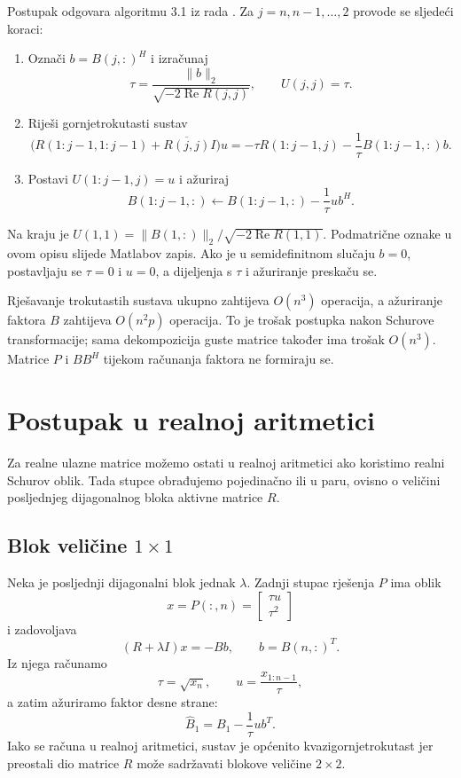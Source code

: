 \documentclass[12pt,a4paper]{article}
\begin{document}
Postupak odgovara algoritmu 3.1 iz rada \cite{sorensen}. Za $j = n,n-1,\ldots,2$ provode se sljedeći koraci:
\begin{enumerate}
\item Označi $b = B(j,:)^{H}$ i izračunaj
\[
\tau = \frac{\lVert b\rVert_2}{\sqrt{-2\operatorname{Re}R(j,j)}},
\qquad U(j,j) = \tau.
\]
\item Riješi gornjetrokutasti sustav
\[
\bigl(R(1{:}j{-}1,1{:}j{-}1) + \overline{R(j,j)}I\bigr)u
= -\tau R(1{:}j{-}1,j) - \frac{1}{\tau}B(1{:}j{-}1,:)b.
\]
\item Postavi $U(1{:}j{-}1,j) = u$ i ažuriraj
\[
B(1{:}j{-}1,:) \leftarrow B(1{:}j{-}1,:) - \frac{1}{\tau}ub^{H}.
\]
\end{enumerate}
Na kraju je $U(1,1) = \lVert B(1,:)\rVert_2/\sqrt{-2\operatorname{Re}R(1,1)}$. Podmatrične oznake u ovom opisu slijede Matlabov zapis. Ako je u semidefinitnom slučaju $b = 0$, postavljaju se $\tau = 0$ i $u = 0$, a dijeljenja s $\tau$ i ažuriranje preskaču se.

Rješavanje trokutastih sustava ukupno zahtijeva $O(n^3)$ operacija, a ažuriranje faktora $B$ zahtijeva $O(n^2p)$ operacija. To je trošak postupka nakon Schurove transformacije; sama dekompozicija guste matrice također ima trošak $O(n^3)$. Matrice $P$ i $BB^{H}$ tijekom računanja faktora ne formiraju se.

\section{Postupak u realnoj aritmetici}

Za realne ulazne matrice možemo ostati u realnoj aritmetici ako koristimo realni Schurov oblik. Tada stupce obrađujemo pojedinačno ili u paru, ovisno o veličini posljednjeg dijagonalnog bloka aktivne matrice $R$.

\subsection{Blok veličine $1\times 1$}

Neka je posljednji dijagonalni blok jednak $\lambda$. Zadnji stupac rješenja $P$ ima oblik
\[
x = P(:,n) = \begin{bmatrix} \tau u \\ \tau^2 \end{bmatrix}
\]
i zadovoljava
\[
(R + \lambda I)x = -Bb, \qquad b = B(n,:)^{T}.
\]
Iz njega računamo
\[
\tau = \sqrt{x_n}, \qquad u = \frac{x_{1:n-1}}{\tau},
\]
a zatim ažuriramo faktor desne strane:
\[
\widehat{B}_1 = B_1 - \frac{1}{\tau}ub^{T}.
\]
Iako se računa u realnoj aritmetici, sustav je općenito kvazigornjetrokutast jer preostali dio matrice $R$ može sadržavati blokove veličine $2\times 2$.
\end{document}
